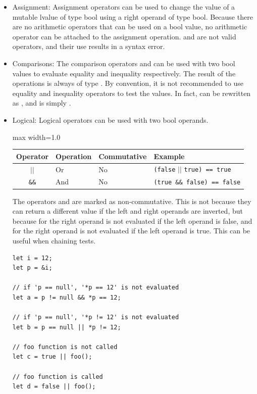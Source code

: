 \begin{itemize}
  \setlength\itemsep{-4pt}
\item Assignment: Assignment operators can be used to change the value of a
  mutable lvalue of type bool using a right operand of type bool. Because there
  are no arithmetic operators that can be used on a bool value, no arithmetic
  operator can be attached to the assignment operation. \token{\&\&=} and
  \token{||=} are not valid operators, and their use results in a syntax error.

\item Comparisons: The comparison operators \token{==} and \token{!=} can be
  used with two bool values to evaluate equality and inequality respectively.
  The result of the operations is always of type . By convention,
  it is not recommended to use equality and inequality operators to test the
   values. In fact,  can be rewritten as
  , and  is simply .

\item Logical: Logical operators can be used with two bool operands.

  \begin{center}
    \begin{adjustbox}{max width=1.0\linewidth}
      \begin{tabular}{|c|l l l|}
        \hline
        Operator & Operation & Commutative & Example\\[0pt]
        \hline
        \hline
        \texttt{\(\vert\vert\)} & Or & No & \texttt{(false} \(\vert{} \vert{}\) \texttt{true) == true}\\[0pt]
        \texttt{\&\&} & And & No & \texttt{(true \&\& false) == false}\\[0pt]
        \hline
      \end{tabular}
    \end{adjustbox}
  \end{center}

  The operators \token{\&\&} and \token{||} are marked as non-commutative. This
  is not because they can return a different value if the left and right operands
  are inverted, but because for \token{\&\&} the right operand is not evaluated
  if the left operand is false, and for \token{||} the right operand is not
  evaluated if the left operand is true. This can be useful when chaining tests.

\begin{lstlisting}[style=coloredverbatim]
let i = 12;
let p = &i;

// if 'p == null', '*p == 12' is not evaluated
let a = p != null && *p == 12;

// if 'p == null', '*p != 12' is not evaluated
let b = p == null || *p != 12;

// foo function is not called
let c = true || foo();

// foo function is called
let d = false || foo();
  \end{lstlisting}
\end{itemize}
